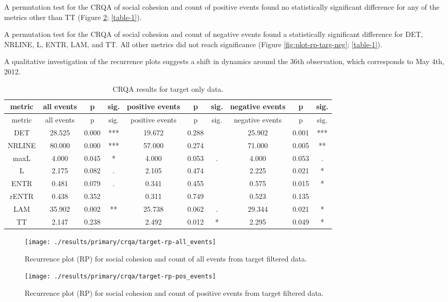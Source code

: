 \documentclass[english,man]{apa6}
\begin{document}
A permutation test for the CRQA of social cohesion and
count of positive events found no statistically significant difference for any
of the metrics other than TT (Figure \ref{fig:plot-rp-targ-pos};
\autoref{table-1}).

A permutation test for the CRQA of social cohesion and
count of negative events found a statistically significant difference for DET,
NRLINE, L, ENTR, LAM, and TT. All other metrics did not reach significance
(Figure \ref{fig:plot-rp-targ-neg}; \autoref{table-1}).

A qualitative investigation of the recurrence plots suggests
a shift in dynamics around the 36th observation,
which corresponds to May 4th, 2012.

\begin{longtable}[]{@{}cccccccccc@{}}
\caption{\label{table-1}CRQA results for target only data.}\tabularnewline
\toprule
metric & all events & p & sig. & positive events & p & sig. & negative events & p & sig.\tabularnewline
\midrule
\endfirsthead
\toprule
metric & all events & p & sig. & positive events & p & sig. & negative events & p & sig.\tabularnewline
\midrule
\endhead
DET & 28.525 & 0.000 & *** & 19.672 & 0.288 & & 25.902 & 0.001 & ***\tabularnewline
NRLINE & 80.000 & 0.000 & *** & 57.000 & 0.274 & & 71.000 & 0.005 & **\tabularnewline
maxL & 4.000 & 0.045 & * & 4.000 & 0.053 & . & 4.000 & 0.053 & .\tabularnewline
L & 2.175 & 0.082 & . & 2.105 & 0.474 & & 2.225 & 0.021 & *\tabularnewline
ENTR & 0.481 & 0.079 & . & 0.341 & 0.455 & & 0.575 & 0.015 & *\tabularnewline
rENTR & 0.438 & 0.352 & & 0.311 & 0.749 & & 0.523 & 0.135 &\tabularnewline
LAM & 35.902 & 0.002 & ** & 25.738 & 0.062 & . & 29.344 & 0.021 & *\tabularnewline
TT & 2.147 & 0.238 & & 2.492 & 0.012 & * & 2.295 & 0.049 & *\tabularnewline
\bottomrule
\end{longtable}

\begin{figure}
\texttt{[image: ./results/primary/crqa/target-rp-all\_events]} \caption{Recurrence plot (RP) for social cohesion and count of all events from target filtered data.}\label{fig:plot-rp-targ-all}
\end{figure}

\begin{figure}
\texttt{[image: ./results/primary/crqa/target-rp-pos\_events]} \caption{Recurrence plot (RP) for social cohesion and count of positive events from target filtered data.}\label{fig:plot-rp-targ-pos}
\end{figure}
\end{document}
